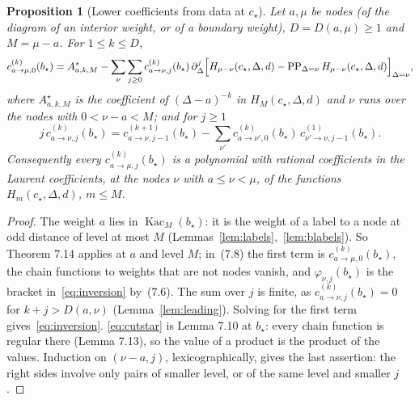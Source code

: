 \documentclass[11pt]{article}
\newtheorem{proposition}[theorem]{Proposition}
\theoremstyle{remark}
\newcommand{\PP}{\operatorname{PP}}
\begin{document}
\begin{proposition}[Lower coefficients from data at $c_\star$]\label{prop:lower}
Let $a,\mu$ be nodes (of the diagram of an interior weight, or of a boundary
weight), $D=D(a,\mu)\ge1$ and $M=\mu-a$.  For $1\le k\le D$,
\begin{equation}\label{eq:inversion}
 c^{(k)}_{a\to\mu,0}(b_\star)=A^\star_{a,k,M}
 -\sum_{\nu}\sum_{j\ge0}c^{(k)}_{a\to\nu,j}(b_\star)\,
 \partial_\Delta^j\Bigl[H_{\mu-\nu}(c_\star,\Delta,d)
 -\PP_{\Delta=\nu}H_{\mu-\nu}(c_\star,\Delta,d)\Bigr]_{\Delta=\nu},
\end{equation}
where $A^\star_{a,k,M}$ is the coefficient of $(\Delta-a)^{-k}$ in
$H_M(c_\star,\Delta,d)$ and $\nu$ runs over the nodes with $0<\nu-a<M$; and for
$j\ge1$
\begin{equation}\label{eq:cutstar}
 j\,c^{(k)}_{a\to\nu,j}(b_\star)=c^{(k+1)}_{a\to\nu,j-1}(b_\star)
 -\sum_{\nu'}c^{(k)}_{a\to\nu',0}(b_\star)\,c^{(1)}_{\nu'\to\nu,j-1}(b_\star).
\end{equation}
Consequently every $c^{(k)}_{a\to\mu,j}(b_\star)$ is a polynomial with rational
coefficients in the Laurent coefficients, at the nodes $\nu$ with
$a\le\nu<\mu$, of the functions $H_m(c_\star,\Delta,d)$, $m\le M$.
\end{proposition}

\begin{proof}
The weight $a$ lies in $\operatorname{Kac}_M(b_\star)$: it is the weight of a
label to a node at odd distance of level at most $M$
(Lemmas~\ref{lem:labels},~\ref{lem:blabels}).  So Theorem 7.14 applies at $a$
and level $M$; in~(7.8) the first term is $c^{(k)}_{a\to\mu,0}(b_\star)$, the
chain functions to weights that are not nodes vanish, and
$\varphi_{\nu,j}(b_\star)$ is the bracket in~\eqref{eq:inversion} by~(7.6).
The sum over $j$ is finite, as $c^{(k)}_{a\to\nu,j}(b_\star)=0$ for
$k+j>D(a,\nu)$ (Lemma~\ref{lem:leading}).  Solving for the first term
gives~\eqref{eq:inversion}.  \eqref{eq:cutstar} is Lemma 7.10 at $b_\star$:
every chain function is regular there (Lemma 7.13), so the value of a product
is the product of the values.  Induction on $(\nu-a,j)$, lexicographically,
gives the last assertion: the right sides involve only pairs of smaller level,
or of the same level and smaller $j$.
\end{proof}
\end{document}
